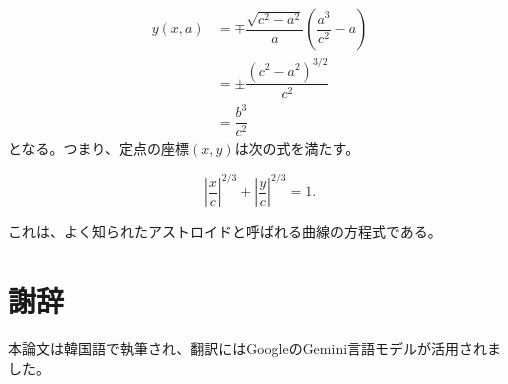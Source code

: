 \documentclass[twocolumn]{article}
\begin{document}
	$$ \begin{aligned}
		y(x, a) &= \mp \dfrac{\sqrt{c^2-a^2}}{a}\left(\dfrac{a^3}{c^2}-a\right)\\
		& = \pm \dfrac{\left( c^2- a^2 \right)^{3/2}}{c^2}\\
		& = \dfrac{b^3}{c^2}
	\end{aligned}
	$$
%	
	となる。つまり、定点の座標$(x, y)$は次の式を満たす。
	
	$$ \left|\dfrac{x}{c}\right|^{2/3} + \left|\dfrac{y}{c}\right|^{2/3} = 1. $$
	
	これは、よく知られたアストロイドと呼ばれる曲線の方程式である。
	
	
	\section*{謝辞}
	本論文は韓国語で執筆され、翻訳にはGoogleのGemini言語モデルが活用されました。
	
\end{document}
